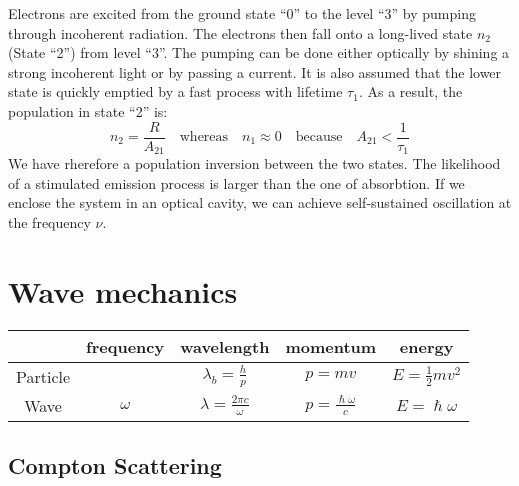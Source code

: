\documentclass{article}
\begin{document}
\begin{twocolumn}
\begin{donotbrake}
Electrons are excited from the ground state ``0'' to the level ``3'' by pumping through incoherent radiation. 
The electrons then fall onto a long-lived state $n_2$ (State ``2'') from level ``3''. 
The pumping can be done either optically by shining a strong incoherent light or by passing a current. 
It is also assumed that the lower state is quickly emptied by a fast process with lifetime $\tau_1$. 
As a result, the population in state ``2'' is:
$$n_2 = \frac{R}{A_{21}} \quad \text{whereas} \quad n_1 \approx 0 \quad \text{because} \quad  A_{21} < \frac{1}{\tau_1}$$
We have rherefore a population inversion between the two states. 
The likelihood of a stimulated emission process is larger than the one of absorbtion. 
If we enclose the system in an optical cavity, we can achieve self-sustained oscillation at the frequency $\nu$.

\end{donotbrake}

\section{Wave mechanics}

\begin{center}
	\begin{tabular}{ccccc}
		& frequency & wavelength & momentum & energy \\
		\midrule
		Particle & & $\lambda_b = \frac{h}{p}$ & $p = m v$ & $E = \frac{1}{2} m v^2$ \\
		Wave & $\omega$ & $\lambda = \frac{2\pi c}{\omega}$ & $p = \frac{\hslash \omega}{c}$ & $E = \hslash \omega$ \\
	\end{tabular}
\end{center}

\begin{donotbrake}
\subsection{Compton Scattering}


\end{donotbrake}
\end{twocolumn}
\end{document}
